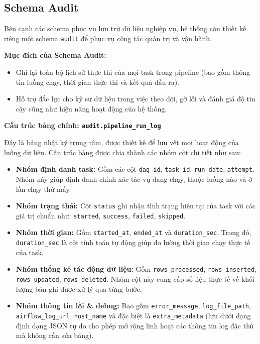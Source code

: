 \subsection{Schema Audit}

Bên cạnh các schema phục vụ lưu trữ dữ liệu nghiệp vụ, hệ thống còn thiết kế riêng một schema \texttt{audit} để phục vụ công tác quản trị và vận hành. 

\textbf{Mục đích của Schema Audit:}
\begin{itemize}
    \item Ghi lại toàn bộ lịch sử thực thi của mọi task trong pipeline (bao gồm thông tin luồng chạy, thời gian thực thi và kết quả đầu ra).
    \item Hỗ trợ đắc lực cho kỹ sư dữ liệu trong việc theo dõi, gỡ lỗi và đánh giá độ tin cậy cũng như hiệu năng hoạt động của hệ thống.
\end{itemize}

\textbf{Cấu trúc bảng chính: \texttt{audit.pipeline\_run\_\allowbreak log}}

Đây là bảng nhật ký trung tâm, được thiết kế để lưu vết mọi hoạt động của luồng dữ liệu. Cấu trúc bảng được chia thành các nhóm cột chi tiết như sau:

\begin{itemize}
    \item \textbf{Nhóm định danh task:} Gồm các cột \texttt{dag\_id}, \texttt{task\_id}, \texttt{run\_date}, \texttt{attempt}. Nhóm này giúp định danh chính xác tác vụ đang chạy, thuộc luồng nào và ở lần chạy thứ mấy.
    \item \textbf{Nhóm trạng thái:} Cột \texttt{status} ghi nhận tình trạng hiện tại của task với các giá trị chuẩn như: \texttt{started}, \texttt{success}, \texttt{failed}, \texttt{skipped}.
    \item \textbf{Nhóm thời gian:} Gồm \texttt{started\_at}, \texttt{ended\_at} và \texttt{duration\_sec}. Trong đó, \texttt{duration\_sec} là cột tính toán tự động giúp đo lường thời gian chạy thực tế của task.
    \item \textbf{Nhóm thống kê tác động dữ liệu:} Gồm \texttt{rows\_processed}, \texttt{rows\_inserted}, \texttt{rows\_updated}, \texttt{rows\_deleted}. Nhóm cột này cung cấp số liệu thực tế về khối lượng bản ghi được xử lý qua từng bước.
    \item \textbf{Nhóm thông tin lỗi \& debug:} Bao gồm \texttt{error\_message}, \texttt{log\_file\_path}, \texttt{airflow\_log\_url}, \texttt{host\_name} và đặc biệt là \texttt{extra\_metadata} (lưu dưới dạng định dạng JSON tự do cho phép mở rộng linh hoạt các thông tin log đặc thù mà không cần sửa bảng).
\end{itemize}


